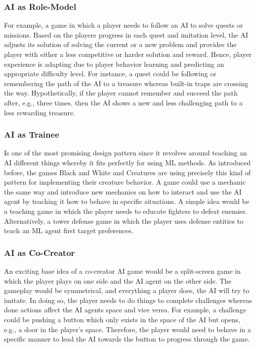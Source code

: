 \documentclass[MGS,Master,english]{twbook}%
\begin{document}
\subsubsection{AI as Role-Model}
For example, a game in which a player needs to follow an AI to solve quests or missions. Based on the players progress in each quest and imitation level, the AI adjusts its solution of solving the current or a new problem and provides the player with either a less competitive or harder solution and reward. Hence, player experience is adapting due to player behavior learning and predicting an appropriate difficulty level. For instance, a quest could be following or remembering the path of the AI to a treasure whereas built-in traps are crossing the way. Hypothetically, if the player cannot remember and succeed the path after, e.g., three times, then the AI shows a new and less challenging path to a less rewarding treasure.

\subsubsection{AI as Trainee}
Is one of the most promising design pattern since it revolves around teaching an AI different things whereby it fits perfectly for using ML methods. As introduced before, the games Black and White and Creatures are using precisely this kind of pattern for implementing their creature behavior. A game could use a mechanic the same way and introduce new mechanics on how to interact and use the AI agent by teaching it how to behave in specific situations. A simple idea would be a teaching game in which the player needs to educate fighters to defeat enemies. Alternatively, a tower defense game in which the player uses defense entities to teach an ML agent first target preferences.
	
\subsubsection{AI as Co-Creator}
An exciting base idea of a co-creator AI game would be a split-screen game in which the player plays on one side and the AI agent on the other side. The gameplay would be symmetrical, and everything a player does, the AI will try to imitate. In doing so, the player needs to do things to complete challenges whereas done actions affect the AI agents space and vice versa. For example, a challenge could be pushing a button which only exists in the space of the AI but opens, e.g., a door in the player's space. Therefore, the player would need to behave in a specific manner to lead the AI towards the button to progress through the game.
\end{document}
